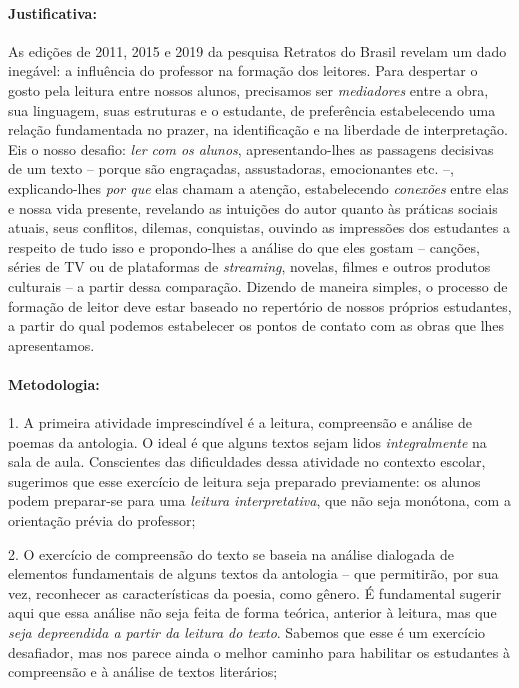 \documentclass[11pt]{extarticle}
\begin{document}
\paragraph{Justificativa:} As edições de 2011, 2015 e 2019 da pesquisa
Retratos do Brasil revelam um dado inegável: a influência do professor
na formação dos leitores. Para despertar o gosto pela leitura entre
nossos alunos, precisamos ser \emph{mediadores} entre a obra, sua
linguagem, suas estruturas e o estudante, de preferência estabelecendo
uma relação fundamentada no prazer, na identificação e na liberdade de
interpretação. Eis o nosso desafio: \emph{ler com os alunos},
apresentando-lhes as passagens decisivas de um texto -- porque são
engraçadas, assustadoras, emocionantes etc. --, explicando-lhes
\emph{por que} elas chamam a atenção, estabelecendo \emph{conexões}
entre elas e nossa vida presente, revelando as intuições do autor quanto
às práticas sociais atuais, seus conflitos, dilemas, conquistas, ouvindo
as impressões dos estudantes a respeito de tudo isso e propondo-lhes a
análise do que eles gostam -- canções, séries de TV ou de plataformas de
\emph{streaming}, novelas, filmes e outros produtos culturais -- a
partir dessa comparação. Dizendo de maneira simples, o processo de
formação de leitor deve estar baseado no repertório de nossos próprios
estudantes, a partir do qual podemos estabelecer os pontos de contato
com as obras que lhes apresentamos.

\paragraph{Metodologia: }

1. A primeira atividade imprescindível é a leitura, compreensão e
análise de poemas da antologia. O ideal é que alguns textos sejam lidos
\emph{integralmente} na sala de aula. Conscientes das dificuldades dessa
atividade no contexto escolar, sugerimos que esse exercício de leitura
seja preparado previamente: os alunos podem preparar-se para uma
\emph{leitura interpretativa}, que não seja monótona, com a orientação
prévia do professor;

2. O exercício de compreensão do texto se baseia na análise dialogada de
elementos fundamentais de alguns textos da antologia -- que permitirão,
por sua vez, reconhecer as características da poesia, como gênero. É
fundamental sugerir aqui que essa análise não seja feita de forma
teórica, anterior à leitura, mas que \emph{seja depreendida a partir da
leitura do texto}. Sabemos que esse é um exercício desafiador, mas nos
parece ainda o melhor caminho para habilitar os estudantes à compreensão
e à análise de textos literários;
\end{document}
